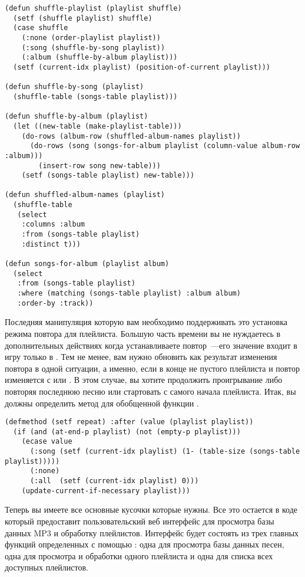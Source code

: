 \begin{lstlisting}
(defun shuffle-playlist (playlist shuffle)
  (setf (shuffle playlist) shuffle)
  (case shuffle
    (:none (order-playlist playlist))
    (:song (shuffle-by-song playlist))
    (:album (shuffle-by-album playlist)))
  (setf (current-idx playlist) (position-of-current playlist)))

(defun shuffle-by-song (playlist)
  (shuffle-table (songs-table playlist)))

(defun shuffle-by-album (playlist)
  (let ((new-table (make-playlist-table)))
    (do-rows (album-row (shuffled-album-names playlist))
      (do-rows (song (songs-for-album playlist (column-value album-row :album)))
        (insert-row song new-table)))
    (setf (songs-table playlist) new-table)))

(defun shuffled-album-names (playlist)
  (shuffle-table 
   (select
    :columns :album
    :from (songs-table playlist)
    :distinct t)))

(defun songs-for-album (playlist album)
  (select
   :from (songs-table playlist) 
   :where (matching (songs-table playlist) :album album)
   :order-by :track))
\end{lstlisting}

Последняя манипуляция которую вам необходимо поддерживать это установка режима повтора для
плейлиста. Большую часть времени вы не нуждаетесь в дополнительных действиях когда
устанавливаете повтор~---его значение входит в игру только в
.  Тем не менее, вам нужно обновить  как
результат изменения повтора в одной ситуации, а именно, если  в конце не
пустого плейлиста и повтор изменяется с  или . В этом случае, вы
хотите продолжить проигрывание либо повторяя последнюю песню или стартовать с самого
начала плейлиста. Итак, вы должны определить метод  для обобщенной функции
.

\begin{lstlisting}
(defmethod (setf repeat) :after (value (playlist playlist))
  (if (and (at-end-p playlist) (not (empty-p playlist)))
    (ecase value
      (:song (setf (current-idx playlist) (1- (table-size (songs-table playlist)))))
      (:none)
      (:all  (setf (current-idx playlist) 0)))
    (update-current-if-necessary playlist)))
\end{lstlisting}

Теперь вы имеете все основные кусочки которые нужны. Все это остается в коде который
предоставит пользовательский веб интерфейс для просмотра базы данных MP3 и обработку
плейлистов. Интерфейс будет состоять из трех главных функций определенных с помощью
: одна для просмотра базы данных песен, одна для просмотра и
обработки одного плейлиста и одна для списка всех доступных плейлистов.

